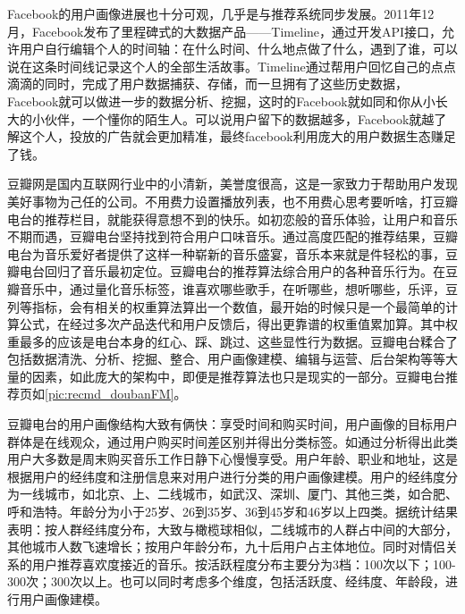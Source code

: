 		Facebook的用户画像进展也十分可观，几乎是与推荐系统同步发展。2011年12月，Facebook发布了里程碑式的大数据产品——Timeline，通过开发API接口，允许用户自行编辑个人的时间轴：在什么时间、什么地点做了什么，遇到了谁，可以说在这条时间线记录这个人的全部生活故事。Timeline通过帮用户回忆自己的点点滴滴的同时，完成了用户数据捕获、存储，而一旦拥有了这些历史数据，Facebook就可以做进一步的数据分析、挖掘，这时的Facebook就如同和你从小长大的小伙伴，一个懂你的陌生人。可以说用户留下的数据越多，Facebook就越了解这个人，投放的广告就会更加精准，最终facebook利用庞大的用户数据生态赚足了钱。

		豆瓣网是国内互联网行业中的小清新，美誉度很高，这是一家致力于帮助用户发现美好事物为己任的公司\citep{recmd-douban}。不用费力设置播放列表，也不用费心思考要听啥，打豆瓣电台的推荐栏目，就能获得意想不到的快乐。如初恋般的音乐体验，让用户和音乐不期而遇，豆瓣电台坚持找到符合用户口味音乐。通过高度匹配的推荐结果，豆瓣电台为音乐爱好者提供了这样一种崭新的音乐盛宴，音乐本来就是件轻松的事，豆瓣电台回归了音乐最初定位。豆瓣电台的推荐算法综合用户的各种音乐行为\citep{recmd-doubanFM}。在豆瓣音乐中，通过量化音乐标签，谁喜欢哪些歌手，在听哪些，想听哪些，乐评，豆列等指标，会有相关的权重算法算出一个数值，最开始的时候只是一个最简单的计算公式，在经过多次产品迭代和用户反馈后，得出更靠谱的权重值累加算。其中权重最多的应该是电台本身的红心、踩、跳过、这些显性行为数据。豆瓣电台糅合了包括数据清洗、分析、挖掘、整合、用户画像建模、编辑与运营、后台架构等等大量的因素，如此庞大的架构中，即便是推荐算法也只是现实的一部分。豆瓣电台推荐页如\autoref{pic:recmd_doubanFM}。

		豆瓣电台的用户画像结构大致有俩快：享受时间和购买时间，用户画像的目标用户群体是在线观众，通过用户购买时间差区别并得出分类标签。如通过分析得出此类用户大多数是周末购买音乐工作日静下心慢慢享受。用户年龄、职业和地址，这是根据用户的经纬度和注册信息来对用户进行分类的用户画像建模。用户的经纬度分为一线城市，如北京、上、二线城市，如武汉、深圳、厦门、其他三类，如合肥、呼和浩特。年龄分为小于25岁、26到35岁、36到45岁和46岁以上四类。据统计结果表明：按人群经纬度分布，大致与橄榄球相似，二线城市的人群占中间的大部分，其他城市人数飞速增长；按用户年龄分布，九十后用户占主体地位。同时对情侣关系的用户推荐喜欢度接近的音乐。按活跃程度分布主要分为3档：100次以下；100-300次；300次以上。也可以同时考虑多个维度，包括活跃度、经纬度、年龄段，进行用户画像建模。
		\begin{figure}
	    \centering
	      \label{pic:recmd_doubanFM}
	    \end{figure}

